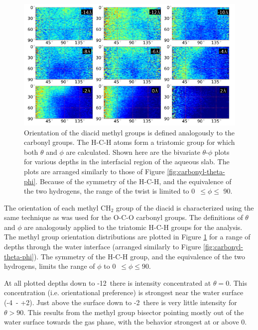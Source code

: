\begin{figure}[h!]
	\begin{center}
		\includegraphics[scale=1.0]{images/bond-angles/methyl-theta-phi.png}
		\caption{Orientation of the diacid methyl groups is defined analogously to the carbonyl groups. The H-C-H atoms form a triatomic group for which both $\theta$ and $\phi$ are calculated. Shown here are the bivariate $\theta$-$\phi$ plots for various depths in the interfacial region of the aqueous slab. The plots are arranged similarly to those of Figure \ref{fig:carbonyl-theta-phi}. Because of the symmetry of the H-C-H, and the equivalence of the two hydrogens, the range of the twist is limited to 0\textdegree~$\leq \phi \leq$ 90\textdegree.}
		\label{fig:methyl-theta-phi}
	\end{center}
\end{figure}

The orientation of each methyl CH$_2$ group of the diacid is characterized using the same technique as was used for the O-C-O carbonyl groups. The definitions of $\theta$ and $\phi$ are analogously applied to the triatomic H-C-H groups for the analysis. The methyl group orientation distributions are plotted in Figure \ref{fig:methyl-theta-phi} for a range of depths through the water interface (arranged similarly to Figure \ref{fig:carbonyl-theta-phi}). The symmetry of the H-C-H group, and the equivalence of the two hydrogens, limits the range of $\phi$ to 0\textdegree~$\leq \phi \leq 90$\textdegree.

At all plotted depths down to -12\angs~there is intensity concentrated at $\theta=0$\textdegree. This concentration (i.e. orientational preference) is strongest near the water surface (-4\angs~- +2\angs). Just above the surface down to -2\angs~there is very little intensity for $\theta >90$\textdegree. This results from the methyl group bisector pointing mostly out of the water surface towards the gas phase, with the behavior strongest at or above 0\angs.

